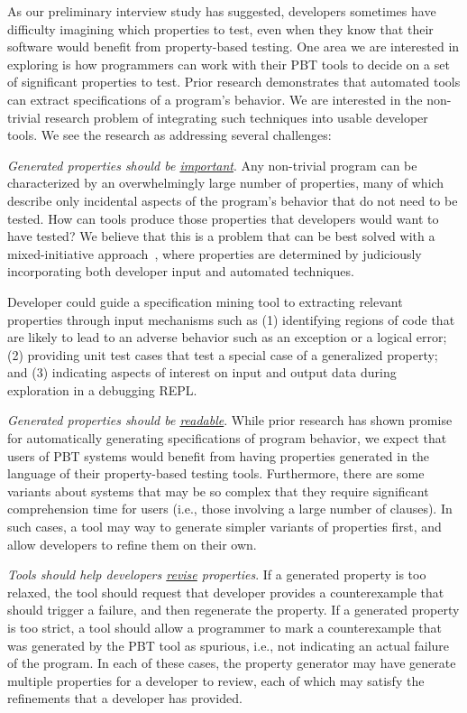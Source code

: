 As our preliminary interview study has suggested, developers sometimes have
difficulty imagining which properties to test, even when they know that their
software would benefit from property-based testing. One area we are interested
in exploring is how programmers can work with their PBT tools to decide on a set
of significant properties to test.  Prior research demonstrates that automated
tools can extract specifications of a program's
behavior\cite{ammons2002mining,le2018deep,claessen2010quickspec}. We are
interested in the non-trivial research problem of integrating such techniques
into usable developer tools. We see the research as addressing several
challenges:

\textit{Generated properties should be \underline{important}}. Any non-trivial
program can be characterized by an overwhelmingly large number of properties,
many of which describe only incidental aspects of the program's behavior that do
not need to be tested. How can tools produce those properties that developers
would want to have tested? We believe that this is a problem that can be best
solved with a mixed-initiative approach~\cite{allen1999mixed}, where properties
are determined by judiciously incorporating both developer input and automated
techniques.

Developer could guide a specification mining tool to extracting relevant
properties through input mechanisms such as (1) identifying regions of code that
are likely to lead to an adverse behavior such as an exception or a logical
error; (2) providing unit test cases that test a special case of a generalized
property; and (3) indicating aspects of interest on input and output data during
exploration in a debugging REPL.

\textit{Generated properties should be \underline{readable}}. While prior research
has shown promise for automatically generating specifications of program
behavior, we expect that users of PBT systems would benefit from having
properties generated in the language of their property-based testing tools.
Furthermore, there are some variants about systems that may be so complex that
they require significant comprehension time for users (i.e., those involving a
large number of clauses). In such cases, a tool may way to generate simpler
variants of properties first, and allow developers to refine them on their own.

\textit{Tools should help developers \underline{revise} properties}. If a generated
property is too relaxed, the tool should request that developer provides a
counterexample that should trigger a failure, and then regenerate the property.
If a generated property is too strict, a tool should allow a programmer to mark
a counterexample that was generated by the PBT tool as spurious, i.e., not
indicating an actual failure of the program. In each of these cases, the
property generator may have generate multiple properties for a developer to
review, each of which may satisfy the refinements that a developer has provided.

